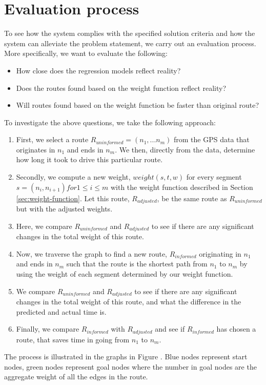 \section{Evaluation process}
To see how the system complies with the specified solution criteria and how the system can alleviate the problem statement, we carry out an evaluation process. More specifically, we want to evaluate the following:
\begin{itemize}
\item How close does the regression models reflect reality?
\item Does the routes found based on the weight function reflect reality?
\item Will routes found based on the weight function be faster than original route?
\end{itemize}
To investigate the above questions, we take the following approach:
\begin{enumerate}
\item First, we select a route $R_{uninformed}=(n_1,...n_m)$ from the GPS data that originates in $n_1$ and ends in $n_m$. We then, directly from the data, determine how long it took to drive this particular route.
\item Secondly, we compute a new weight, $weight(s, t, w)$ for every segment $s=(n_i,n_{i+1}) for 1 \leq i \leq m$ with the weight function described in Section \ref{sec:weight-function}. Let this route, $R_{adjusted}$, be the same route as $R_{uninformed}$ but with the adjusted weights.
\item Here, we compare $R_{uninformed}$ and $R_{adjusted}$ to see if there are any significant changes in the total weight of this route.
\item Now, we traverse the graph to find a new route, $R_{informed}$ originating in $n_1$ and ends in $n_m$ such that the route is the shortest path from $n_1$ to $n_m$ by using the weight of each segment determined by our weight function.
\item We compare $R_{uninformed}$ and $R_{adjusted}$ to see if there are any significant changes in the total weight of this route, and what the difference in the predicted and actual time is.
\item Finally, we compare $R_{informed}$ with $R_{adjusted}$ and see if $R_{informed}$ has chosen a route, that saves time in going from $n_1$ to $n_m$.
\end{enumerate}
The process is illustrated in the graphs in Figure . Blue nodes represent start nodes, green nodes represent goal nodes where the number in goal nodes are the aggregate weight of all the edges in the route. 

